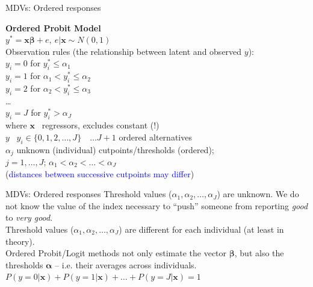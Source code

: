 \documentclass[usenames,dvipsnames]{beamer}
\begin{document}
\begin{frame}{MDVs: Ordered responses}

{\small
\textbf{Ordered Probit Model} \\
\bigskip
\quad $y^{\ast} = \bm{x \beta} + e, \ e|\bm{x} \sim \textit{N}(0,1)$ \\
\bigskip
Observation rules (the relationship between latent and observed $y$): \\
\medskip
\qquad $y_i = 0$ for \hspace*{10mm} $y_i^{\ast} \le \alpha_1$ \\
\medskip
\qquad $y_i = 1$ for \quad  $\alpha_1 < y_i^{\ast} \le \alpha_2$ \\
\medskip
\qquad $y_i = 2$ for \quad  $\alpha_2 < y_i^{\ast} \le \alpha_3$ \\
\qquad \dots \\

\qquad $y_i = J$ for \hspace*{10mm} $y_i^{\ast} > \alpha_J$ \\
\bigskip
where $\bm{x}$ \quad \ regressors, excludes constant (!) \\
\smallskip
\hspace*{9mm} $y$ \quad \ $y_i \in \{0,1,2, \dots, J \} \quad \dots J+1 $ ordered alternatives \\
\smallskip
\hspace*{9mm} $\alpha_j$  \quad unknown (individual) cutpoints/thresholds (ordered);\\ 
\hspace*{17mm} $j = 1, \dots, J$; $\alpha_1 < \alpha_2 < \dots < \alpha_J$ \\
\smallskip
\hspace*{17mm} (\textcolor{Blue}{distances between successive cutpoints may differ})}
\end{frame}
\begin{frame}{MDVs: Ordered responses}
Threshold values ($\alpha_1, \alpha_2, \dots, \alpha_J$) are unknown.  We do not know the value of the index necessary to ``push'' someone from reporting \textit{good} to \textit{very good}. \\
\vspace*{6mm}
Threshold values ($\alpha_1, \alpha_2, \dots, \alpha_J$) are different for each individual (at least in theory).\\
\vspace*{6mm}
Ordered Probit/Logit methods not only estimate the vector $\bm{\beta}$, but also the thresholds $\bm{\alpha}$ – i.e. their averages across individuals. \\
\vspace*{6mm}
$P(y=0|\bm{x}) + P(y=1|\bm{x}) + \dots + P(y=J|\bm{x}) = 1$
\end{frame}
\end{document}
